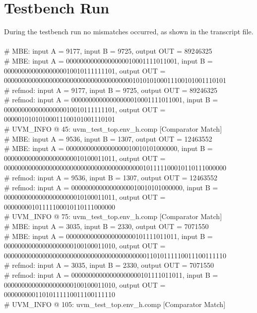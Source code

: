 \section{Testbench Run}


During the testbench run no mismatches occurred, as shown in the transcript file.\\
\\
\# MBE: input A =       9177, input B =       9725, output OUT =             89246325\\
\# MBE: input A = 00000000000000000010001111011001, input B = 00000000000000000010010111111101, output OUT = 0000000000000000000000000000000000000101010100011100101001110101\\
\# refmod: input A =        9177, input B =        9725, output OUT =    89246325\\
\# refmod: input A = 00000000000000000010001111011001, input B = 00000000000000000010010111111101, output OUT = 00000101010100011100101001110101\\
\# UVM\_INFO @ 45: uvm\_test\_top.env\_h.comp [Comparator Match] \\
\# MBE: input A =       9536, input B =       1307, output OUT =             12463552\\
\# MBE: input A = 00000000000000000010010101000000, input B = 00000000000000000000010100011011, output OUT = 0000000000000000000000000000000000000000101111100010110111000000\\
\# refmod: input A =        9536, input B =        1307, output OUT =    12463552\\
\# refmod: input A = 00000000000000000010010101000000, input B = 00000000000000000000010100011011, output OUT = 00000000101111100010110111000000\\
\# UVM\_INFO @ 75: uvm\_test\_top.env\_h.comp [Comparator Match] \\
\# MBE: input A =       3035, input B =       2330, output OUT =              7071550\\
\# MBE: input A = 00000000000000000000101111011011, input B = 00000000000000000000100100011010, output OUT = 0000000000000000000000000000000000000000011010111110011100111110\\
\# refmod: input A =        3035, input B =        2330, output OUT =     7071550\\
\# refmod: input A = 00000000000000000000101111011011, input B = 00000000000000000000100100011010, output OUT = 00000000011010111110011100111110\\
\# UVM\_INFO @ 105: uvm\_test\_top.env\_h.comp [Comparator Match] \\
